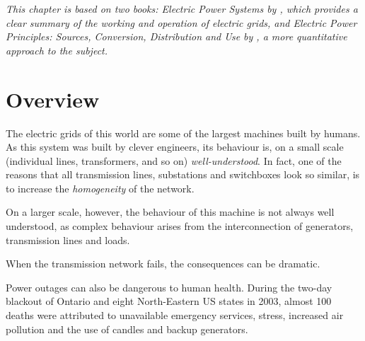 \documentclass[main.tex]{subfiles}
\begin{document}





\emph{This chapter is based on two books: \emph{Electric Power Systems} by \cite{VonMeier2006}, which provides a clear summary of the working and operation of electric grids, and \emph{Electric Power Principles: Sources, Conversion, Distribution and Use} by \cite{Kirtley2010}, a more quantitative approach to the subject.}
\section{Overview}
The electric grids of this world are some of the largest machines built by humans. As this system was built by clever engineers, its behaviour is, on a small scale (individual lines, transformers, and so on) \emph{well-understood}. In fact, one of the reasons that all transmission lines, substations and switchboxes look so similar, is to increase the \emph{homogeneity} of the network.

On a larger scale, however, the behaviour of this machine is not always well understood, as complex behaviour arises from the interconnection of generators, transmission lines and loads.

When the transmission network fails, the consequences can be dramatic. 

Power outages can also be dangerous to human health. During the two-day blackout of Ontario and eight North-Eastern US states in 2003, almost 100 deaths were attributed to unavailable emergency services, stress, increased air pollution and the use of candles and backup generators.

\end{document}

